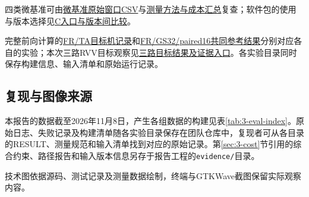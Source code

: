 四类微基准可由\href{https://github.com/cc77-builder/riscv/blob/6fc3972158daec30bad37b97b72c4653155e1260/team/optimizations/o2/r3-div-gate/performance/results/samples.csv}{微基准原始窗口CSV}与\href{https://github.com/cc77-builder/riscv/blob/6fc3972158daec30bad37b97b72c4653155e1260/team/optimizations/o2/r3-div-gate/PERFORMANCE_COST_RESULT.md}{测量方法与成本汇总}复查；软件包的使用与版本选择见\href{https://github.com/cc77-builder/riscv/blob/6fc3972158daec30bad37b97b72c4653155e1260/team/docs/version-comparison-r5-g5-20261027.md}{C入口与版本间比较}。

完整前向计算的\href{https://github.com/cc77-builder/riscv/blob/6fc3972158daec30bad37b97b72c4653155e1260/team/optimizations/o2/r2-config-reuse/caller/runq-q288/forward-host/stages/norm/evidence/first-token/analysis/target-summary.json}{FR/TA目标机记录}和\href{https://github.com/cc77-builder/riscv/blob/6fc3972158daec30bad37b97b72c4653155e1260/team/optimizations/o2/r2-config-reuse/caller/runq-q288/fused/first-forward-rvv/evidence/reference-v1/reference-summary.json}{FR/GS32/paired16共同参考结果}分别对应各自的实验；本次三路RVV目标观察见\href{https://github.com/cc77-builder/riscv/blob/75b832d0d3ce82fc09c217e20a226676c7c33ba7/team/optimizations/o2/r2-config-reuse/caller/runq-q288/fused/first-forward-rvv/REFERENCE.md\#target-result-01}{三路目标结果及证据入口}。各实验目录同时保存构建信息、输入清单和原始运行记录。

\subsection{复现与图像来源}
本报告的数据截至2026年11月8日，产生各组数据的构建见表\ref{tab:3-eval-index}。原始日志、失败记录及构建清单随各实验目录保存在团队仓库中，复现者可从各目录的RESULT、测量规范和输入清单找到对应的原始记录。第\ref{sec:3-cost}节引用的综合约束、路径报告和输入版本信息另存于报告工程的\texttt{evidence/}目录。

技术图依据源码、测试记录及测量数据绘制，终端与GTKWave截图保留实际观察内容。
